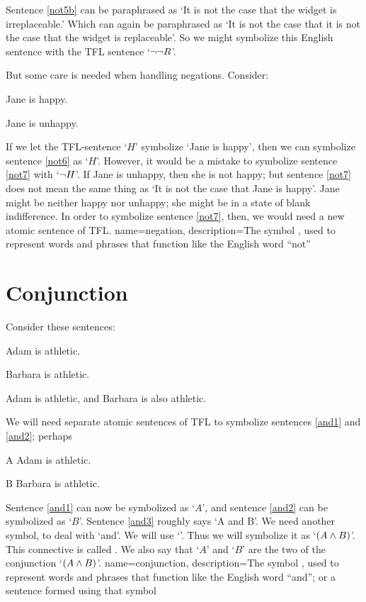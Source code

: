 Sentence \ref{not5b} can be paraphrased as `It is not the case that the widget is irreplaceable.' Which can again be paraphrased as `It is not the case that it is not the case that the widget is replaceable'. So we might symbolize this English sentence with the TFL sentence `$\neg\neg R$'.

But some care is needed when handling negations. Consider:
	\begin{earg}
		\item[\ex{not6}] Jane is happy.
		\item[\ex{not7}] Jane is unhappy.
	\end{earg}
If we let the TFL-sentence `$H$' symbolize  `Jane is happy', then we can symbolize sentence \ref{not6} as `$H$'. However, it would be a mistake to symbolize sentence \ref{not7} with `$\neg{H}$'. If Jane is unhappy, then she is not happy; but sentence \ref{not7} does not mean the same thing as `It is not the case that Jane is happy'. Jane might be neither happy nor unhappy; she might be in a state of blank indifference. In order to symbolize sentence \ref{not7}, then, we would need a new atomic sentence of TFL.
{
name=negation,
description={The symbol \enot, used to represent words and phrases that function like the English word ``not''}
}

\section{Conjunction}
\label{s:ConnectiveConjunction}

Consider these sentences:
	\begin{earg}
		\item[\ex{and1}]Adam is athletic.
		\item[\ex{and2}]Barbara is athletic.
		\item[\ex{and3}]Adam is athletic, and Barbara is also athletic.
	\end{earg}
We will need separate atomic sentences of TFL to symbolize sentences \ref{and1} and \ref{and2}; perhaps
	\begin{ekey}
		\item[A] Adam is athletic.
		\item[B] Barbara is athletic.
	\end{ekey}
Sentence \ref{and1} can now be symbolized as `$A$', and sentence \ref{and2} can be symbolized as `$B$'. Sentence \ref{and3} roughly says `A and B'. We need another symbol, to deal with `and'. We will use `\eand'. Thus we will symbolize it as `$(A\wedge B)$'. This connective is called . We also say that `$A$' and `$B$' are the two  of the conjunction `$(A \wedge B)$'.
{
name=conjunction,
description={The symbol \eand, used to represent words and phrases that function like the English word ``and''; or a sentence formed using that symbol}
}

